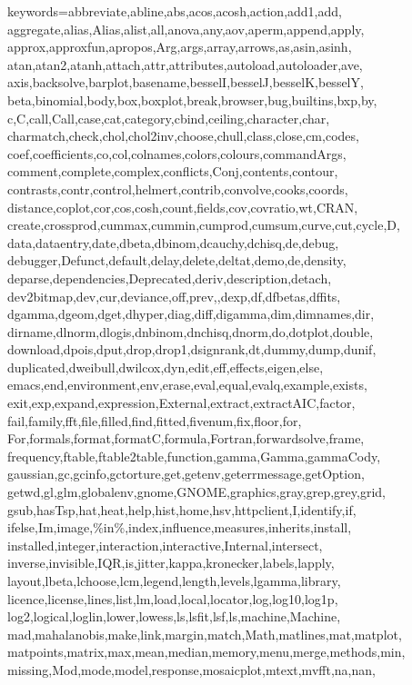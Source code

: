   {keywords={abbreviate,abline,abs,acos,acosh,action,add1,add,%
      aggregate,alias,Alias,alist,all,anova,any,aov,aperm,append,apply,%
      approx,approxfun,apropos,Arg,args,array,arrows,as,asin,asinh,%
      atan,atan2,atanh,attach,attr,attributes,autoload,autoloader,ave,%
      axis,backsolve,barplot,basename,besselI,besselJ,besselK,besselY,%
      beta,binomial,body,box,boxplot,break,browser,bug,builtins,bxp,by,%
      c,C,call,Call,case,cat,category,cbind,ceiling,character,char,%
      charmatch,check,chol,chol2inv,choose,chull,class,close,cm,codes,%
      coef,coefficients,co,col,colnames,colors,colours,commandArgs,%
      comment,complete,complex,conflicts,Conj,contents,contour,%
      contrasts,contr,control,helmert,contrib,convolve,cooks,coords,%
      distance,coplot,cor,cos,cosh,count,fields,cov,covratio,wt,CRAN,%
      create,crossprod,cummax,cummin,cumprod,cumsum,curve,cut,cycle,D,%
      data,dataentry,date,dbeta,dbinom,dcauchy,dchisq,de,debug,%
      debugger,Defunct,default,delay,delete,deltat,demo,de,density,%
      deparse,dependencies,Deprecated,deriv,description,detach,%
      dev2bitmap,dev,cur,deviance,off,prev,,dexp,df,dfbetas,dffits,%
      dgamma,dgeom,dget,dhyper,diag,diff,digamma,dim,dimnames,dir,%
      dirname,dlnorm,dlogis,dnbinom,dnchisq,dnorm,do,dotplot,double,%
      download,dpois,dput,drop,drop1,dsignrank,dt,dummy,dump,dunif,%
      duplicated,dweibull,dwilcox,dyn,edit,eff,effects,eigen,else,%
      emacs,end,environment,env,erase,eval,equal,evalq,example,exists,%
      exit,exp,expand,expression,External,extract,extractAIC,factor,%
      fail,family,fft,file,filled,find,fitted,fivenum,fix,floor,for,%
      For,formals,format,formatC,formula,Fortran,forwardsolve,frame,%
      frequency,ftable,ftable2table,function,gamma,Gamma,gammaCody,%
      gaussian,gc,gcinfo,gctorture,get,getenv,geterrmessage,getOption,%
      getwd,gl,glm,globalenv,gnome,GNOME,graphics,gray,grep,grey,grid,%
      gsub,hasTsp,hat,heat,help,hist,home,hsv,httpclient,I,identify,if,%
      ifelse,Im,image,\%in\%,index,influence,measures,inherits,install,%
      installed,integer,interaction,interactive,Internal,intersect,%
      inverse,invisible,IQR,is,jitter,kappa,kronecker,labels,lapply,%
      layout,lbeta,lchoose,lcm,legend,length,levels,lgamma,library,%
      licence,license,lines,list,lm,load,local,locator,log,log10,log1p,%
      log2,logical,loglin,lower,lowess,ls,lsfit,lsf,ls,machine,Machine,%
      mad,mahalanobis,make,link,margin,match,Math,matlines,mat,matplot,%
      matpoints,matrix,max,mean,median,memory,menu,merge,methods,min,%
      missing,Mod,mode,model,response,mosaicplot,mtext,mvfft,na,nan,%
}}
